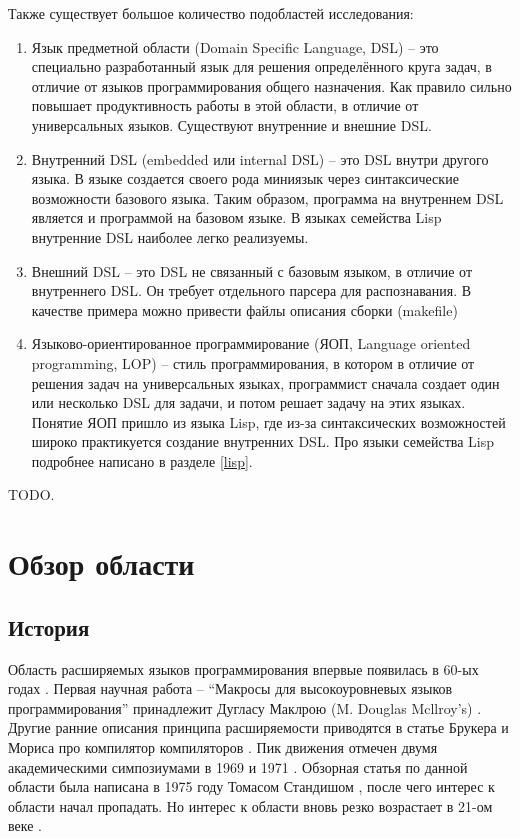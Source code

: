 \documentclass[a4paper,12pt]{article}
\begin{document}
Также существует большое количество подобластей исследования:
\begin{enumerate}
  \item Язык предметной области (Domain Specific Language, DSL) -- это
  специально разработанный язык для решения определённого круга задач, в
  отличие от языков программирования общего назначения. Как правило
  сильно повышает продуктивность работы в этой области, в отличие от
  универсальных языков. Существуют внутренние и внешние DSL.
  \item Внутренний DSL (embedded или internal DSL) -- это DSL внутри другого
  языка. В языке создается своего рода миниязык через синтаксические
  возможности базового языка. Таким образом, программа на внутреннем DSL
  является и программой на базовом языке. В языках семейства Lisp внутренние
  DSL наиболее легко реализуемы.
  \item Внешний DSL -- это DSL не связанный с базовым языком, в отличие от
  внутреннего DSL. Он требует отдельного парсера для распознавания. В качестве
  примера можно привести файлы описания сборки (makefile)
  \item Языково-ориентированное программирование (ЯОП, Language oriented
  programming, LOP) -- стиль программирования, в котором в отличие от решения
  задач на универсальных языках, программист сначала создает один или несколько
  DSL для задачи, и потом решает задачу на этих языках. Понятие ЯОП пришло из
  языка Lisp, где из-за синтаксических возможностей широко практикуется
  создание внутренних DSL. Про языки семейства Lisp подробнее написано в
  разделе \ref{lisp}.
\end{enumerate}
TODO.

\section{Обзор области}

\subsection{История}
\label{hist}
Область расширяемых языков программирования впервые появилась в 60-ых годах
\cite{hist69}. Первая научная работа -- ``Макросы для высокоуровневых языков
программирования'' принадлежит Дугласу Маклрою (M. Douglas Mcllroy's)
\cite{macro60}. Другие ранние описания принципа расширяемости приводятся в
статье Брукера и Мориса про компилятор компиляторов \cite{cc60}.
Пик движения отмечен двумя академическими симпозиумами в 1969 \cite{proc69} и 1971
\cite{proc71}. Обзорная статья по данной области была написана в 1975 году
Томасом Стандишом \cite{Stan75}, после чего интерес к области начал пропадать.
Но интерес к области вновь резко возрастает в 21-ом веке \cite{Ext2105}.
\end{document}

